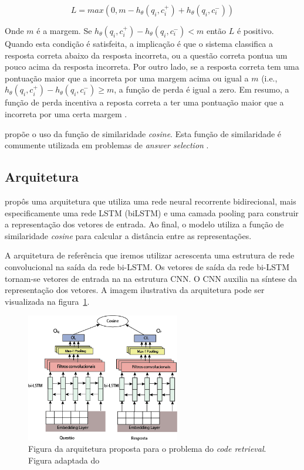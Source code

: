 \documentclass[12pt]{article}
\begin{document}
\begin{equation}
L = max(0, m - h_{\theta}(q_{i}, c_{i}^{+}) + h_{\theta}(q_{i}, c_{i}^{-}))   
\end{equation}


Onde $m$ é a margem. Se $h_{\theta}(q_{i}, c_{i}^{+}) - h_{\theta}(q_{i}, c_{i}^{-}) < m$ então $L$ é positivo. Quando esta condição é satisfeita, a implicação é que o sistema classifica a resposta correta abaixo da resposta incorreta, ou a questão correta pontua um pouco acima da resposta incorreta. Por outro lado, se a resposta correta tem uma pontuação maior que a incorreta por uma margem acima ou igual a $m$ (i.e., $h_{\theta}(q_{i}, c_{i}^{+}) - h_{\theta}(q_{i}, c_{i}^{-}) \geq m$, a função de perda é igual a zero. Em resumo, a função de perda incentiva a reposta correta a ter uma pontuação maior que a incorreta por uma certa margem \cite{lai-etal-2018-review}.

\cite{tan-lstm-qa} propõe o uso da função de similaridade \textit{cosine}. Esta função de similaridade é comumente utilizada em problemas de \textit{answer selection} \cite{feng-answer-selection-2015}. 

\subsection{Arquitetura}

\cite{tan-lstm-qa} propôs uma arquitetura que utiliza uma rede neural recorrente bidirecional, mais especificamente uma rede LSTM (biLSTM) \cite{hochreiter-Schmidhuber-lstm-1997} e uma camada pooling para construir a representação dos vetores de entrada. Ao final, o modelo utiliza a função de similaridade \textit{cosine} para calcular a distância
entre as representações. 

A arquitetura de referência que iremos utilizar acrescenta uma estrutura de rede convolucional na saída da rede bi-LSTM. Os vetores de saída da rede bi-LSTM tornam-se vetores de entrada na na estrutura CNN. O CNN auxilia na síntese da representação dos vetores. A imagem ilustrativa da arquitetura pode ser visualizada na figura~\ref{fig:arquitetura-bi-lstm}.


\begin{figure}[h]
    \centering
    \includegraphics[width=0.60\textwidth]{figures/ArquiteturaBiLSTM.png}
    \caption{Figura da arquitetura proposta para o problema do \textit{code retrieval}. Figura adaptada do \cite{tan-lstm-qa}}
    \label{fig:arquitetura-bi-lstm}
\end{figure}
\end{document}
